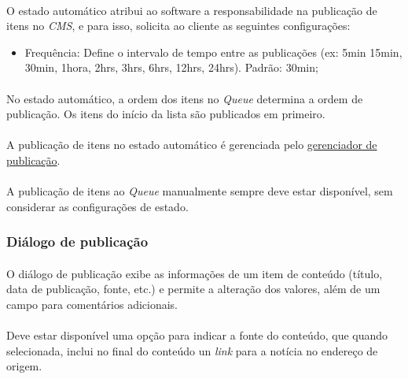 \documentclass[a4paper,12pt]{article}
\def\cms{\emph{CMS}}
\def\queue{\emph{Queue}}
\def\gerenciadorpublicacao{\hyperref[gerenciadorpublicacao]{gerenciador de publicação}}
\begin{document}
\paragraph{}
O estado automático atribui ao software a responsabilidade na publicação de
itens no \cms{}, e para isso, solicita ao cliente as seguintes configurações:

\begin{itemize}

\item Frequência: Define o intervalo de tempo entre as publicações (ex: 5min
15min, 30min, 1hora, 2hrs, 3hrs, 6hrs, 12hrs, 24hrs). Padrão: 30min;

\end{itemize}

\paragraph{}
No estado automático, a ordem dos itens no \queue{} determina a ordem de
publicação. Os itens do início da lista são publicados em primeiro.

\paragraph{}
A publicação de itens no estado automático é gerenciada pelo \gerenciadorpublicacao{}.

\paragraph{}
A publicação de itens ao \queue{} manualmente sempre deve estar disponível, sem
considerar as configurações de estado.

\subsubsection{Diálogo de publicação} \label{dialogopublicacao}

\paragraph{}
O diálogo de publicação exibe as informações de um item de conteúdo (título,
data de publicação, fonte, etc.) e permite a alteração dos valores, além de um
campo para comentários adicionais.

\paragraph{}
Deve estar disponível uma opção para indicar a fonte do conteúdo, que quando
selecionada, inclui no final do conteúdo un \emph{link} para a notícia no
endereço de origem.
\end{document}
